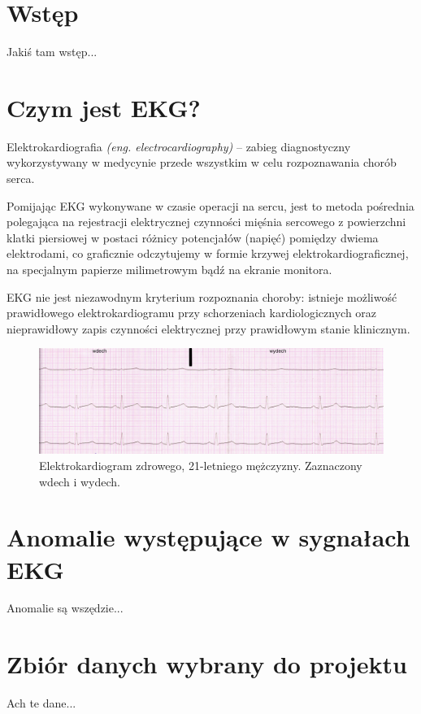 \documentclass[12pt,a4paper]{article}
\begin{document}
\section{Wstęp}
Jakiś tam wstęp...

\section{Czym jest EKG?}
\cite{1} Elektrokardiografia \textit{(eng. electrocardiography)} – zabieg diagnostyczny wykorzystywany w medycynie przede wszystkim w celu rozpoznawania chorób serca.

Pomijając EKG wykonywane w czasie operacji na sercu, jest to metoda pośrednia polegająca na rejestracji elektrycznej czynności mięśnia sercowego z powierzchni klatki piersiowej w postaci różnicy potencjałów (napięć) pomiędzy dwiema elektrodami, co graficznie odczytujemy w formie krzywej elektrokardiograficznej, na specjalnym papierze milimetrowym bądź na ekranie monitora.

EKG nie jest niezawodnym kryterium rozpoznania choroby: istnieje możliwość prawidłowego elektrokardiogramu przy schorzeniach kardiologicznych oraz nieprawidłowy zapis czynności elektrycznej przy prawidłowym stanie klinicznym. 

\begin{figure}[H]
    \centering
    \includegraphics[width=1\linewidth]{EKG_wykres.jpg}
    \caption{\cite{2} Elektrokardiogram zdrowego, 21-letniego mężczyzny. Zaznaczony wdech i wydech.}
    \label{fig:ekg}
\end{figure}

\section{Anomalie występujące w sygnałach EKG}
Anomalie są wszędzie...

\section{Zbiór danych wybrany do projektu}
Ach te dane...
\end{document}
